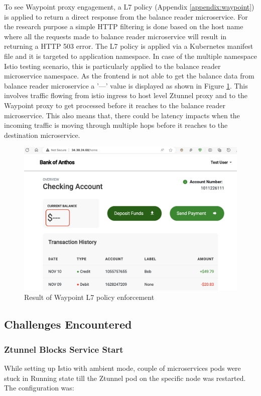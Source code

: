To see Waypoint proxy engagement, a L7 policy (Appendix \ref{appendix:waypoint}) is applied to return a direct response from the balance reader microservice. For the research purpose a simple HTTP filtering is done based on the host name where all the requests made to balance reader microservice will result in returning a HTTP 503 error. The L7 policy is applied via a Kubernetes manifest file and it is targeted to application namespace. In case of the multiple namespace Istio testing scenario, this is particularly applied to the balance reader microservice namespace. As the frontend is not able to get the balance data from balance reader microservice a '---' value is displayed as shown in Figure \ref{method:l7PolicyAppliedView}. This involves traffic flowing from istio ingress to host level Ztunnel proxy and to the Waypoint proxy to get processed before it reaches to the balance reader microservice. This also means that, there could be latency impacts when the incoming traffic is moving through multiple hops before it reaches to the destination microservice.

\begin{figure}[ht!]
    \centering
    \includegraphics[width=1.0\linewidth]{resources/l7-policy-applied.png}
    \caption{Result of Waypoint L7 policy enforcement}
    \label{method:l7PolicyAppliedView}
\end{figure}


\subsection{Challenges Encountered}
\subsubsection{Ztunnel Blocks Service Start}
While setting up Istio with ambient mode, couple of microservices pods were stuck in Running state till the Ztunnel pod on the specific node was restarted. The configuration was:

